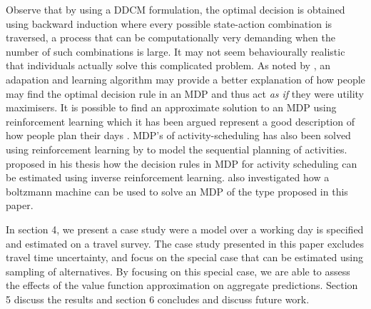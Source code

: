 Observe that by using a DDCM formulation, the optimal decision is obtained using backward induction where every possible state-action combination is traversed, a process that can be computationally very demanding when the number of such combinations is large. It may not seem behaviourally realistic that individuals actually solve this complicated problem. As noted by \citet{RustML88}, an adapation and learning algorithm may provide a better explanation of how people may find the optimal decision rule in an MDP and thus act \emph{as if} they were utility maximisers. It is possible to find an approximate solution to an MDP using reinforcement learning which it has been argued represent a good description of how people plan their days \citep[see, e.g.,][]{arentze2004learning}. MDP's of activity-scheduling has also been solved using reinforcement learning by \citet{vanhusel09} to model the sequential planning of activities. \citet{Feygin18} proposed in his thesis how the decision rules in MDP for activity scheduling can be estimated using inverse reinforcement learning. \citet{karlstromScalingUp2009} also investigated how a boltzmann machine can be used to solve an MDP of the type proposed in this paper. 

In section 4, we present a case study were a model over a working day is specified and estimated on a travel survey. The case study presented in this paper excludes travel time uncertainty, and focus on the special case that can be estimated using sampling of alternatives. By focusing on this special case, we are able to assess the effects of the value function approximation on aggregate predictions. Section 5 discuss the results and section 6 concludes and discuss future work.  


